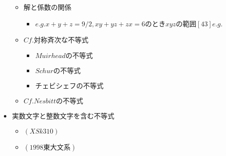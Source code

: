 \documentclass[dvipdfmx,uplatex]{jsarticle}
\begin{document}
\begin{itemize}
\begin{itemize}
\begin{itemize}
		\end{itemize}
		\item 解と係数の関係
		\begin{itemize}
			\item $e.g.x+y+z=9/2,xy+yz+zx=6のときxyzの範囲[43]e.g.$
		\end{itemize}
		\item $ Cf. 対称斉次な不等式$
		\begin{itemize}
			\item $ Muirheadの不等式$
			\item $ Schurの不等式$
			\item $ チェビシェフの不等式$
		\end{itemize}
		\item $ Cf. Nesbittの不等式$
	\end{itemize}
	\item $ 実数文字と整数文字を含む不等式$
	\begin{itemize}
		\item $  (XSk310)$
		\item $ (1998 東大文系)$
	\end{itemize}
\end{itemize}
\end{document}
